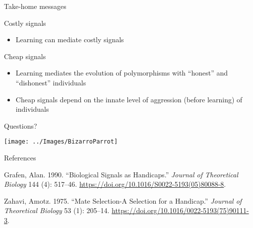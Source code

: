 \documentclass[
  ignorenonframetext,
]{beamer}
\providecommand{\tightlist}{%
  \setlength{\itemsep}{0pt}\setlength{\parskip}{0pt}}
\begin{document}
\begin{frame}{Take-home messages}
\protect\hypertarget{take-home-messages}{}

\begin{block}{Costly signals}

\begin{itemize}
\tightlist
\item
  Learning can mediate costly signals
\end{itemize}

\end{block}

\begin{block}{Cheap signals}

\begin{itemize}
\tightlist
\item
  Learning mediates the evolution of polymorphisms with ``honest'' and
  ``dishonest'' individuals
\item
  Cheap signals depend on the innate level of aggression (before
  learning) of individuals
\end{itemize}

\end{block}

\end{frame}

\begin{frame}{Questions?}
\protect\hypertarget{questions}{}

\begin{center}\texttt{[image: ../Images/BizarroParrot]} \end{center}

\end{frame}

\begin{frame}{References}
\protect\hypertarget{references}{}

\hypertarget{refs}{}
\leavevmode\hypertarget{ref-grafen_Biological_1990}{}%
Grafen, Alan. 1990. ``Biological Signals as Handicaps.'' \emph{Journal
of Theoretical Biology} 144 (4): 517--46.
\url{https://doi.org/10.1016/S0022-5193(05)80088-8}.

\leavevmode\hypertarget{ref-zahavi_Mate_1975}{}%
Zahavi, Amotz. 1975. ``Mate Selection-A Selection for a Handicap.''
\emph{Journal of Theoretical Biology} 53 (1): 205--14.
\url{https://doi.org/10.1016/0022-5193(75)90111-3}.

\end{frame}
\end{document}
